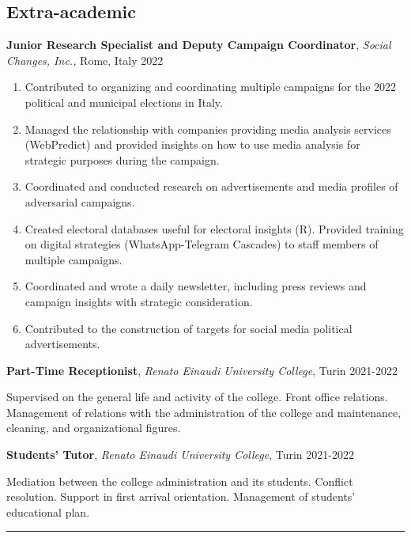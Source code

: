 \documentclass[10pt,]{article}
\providecommand{\tightlist}{%
  \setlength{\itemsep}{0pt}\setlength{\parskip}{0pt}}
\renewenvironment{itemize}{
  \begin{list}{}{
    \setlength{\leftmargin}{1.5em}
  }
}{
  \end{list}
}
\begin{document}
\subsection{Extra-academic}\label{extra-academic}

\begin{itemize}
\item
  \textbf{Junior Research Specialist and Deputy Campaign Coordinator},
  \emph{Social Changes, Inc.,} Rome, Italy \hfill 2022

  \begin{enumerate}
  \def\labelenumi{\alph{enumi})}
  \tightlist
  \item
    Contributed to organizing and coordinating multiple campaigns for
    the 2022 political and municipal elections in Italy.
  \item
    Managed the relationship with companies providing media analysis
    services (WebPredict) and provided insights on how to use media
    analysis for strategic purposes during the campaign.
  \item
    Coordinated and conducted research on advertisements and media
    profiles of adversarial campaigns.
  \item
    Created electoral databases useful for electoral insights (R).
    Provided training on digital strategies (WhatsApp-Telegram Cascades)
    to staff members of multiple campaigns.
  \item
    Coordinated and wrote a daily newsletter, including press reviews
    and campaign insights with strategic consideration.
  \item
    Contributed to the construction of targets for social media
    political advertisements.
  \end{enumerate}
\item
  \textbf{Part-Time Receptionist}, \emph{Renato Einaudi University
  College}, Turin \hfill 2021-2022

  \begin{itemize}
  \tightlist
  \item
    Supervised on the general life and activity of the college. Front
    office relations. Management of relations with the administration of
    the college and maintenance, cleaning, and organizational figures.
  \end{itemize}
\item
  \textbf{Students' Tutor}, \emph{Renato Einaudi University College},
  Turin \hfill 2021-2022

  \begin{itemize}
  \item
    Mediation between the college administration and its students.
    Conflict resolution. Support in first arrival orientation.
    Management of students' educational plan.

    \bigskip \hrule
  \end{itemize}
\end{itemize}
\end{document}
